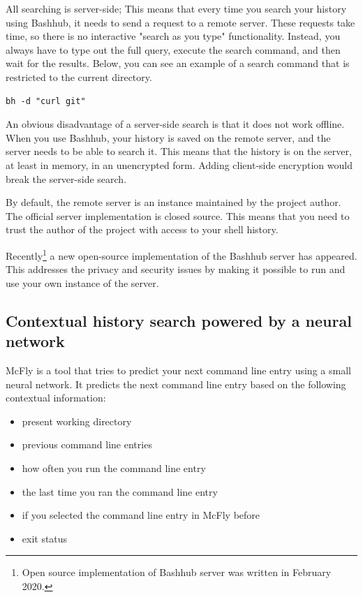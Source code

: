 All searching is server-side; This means that every time you search your history using Bashhub, it needs to send a request to a remote server.
These requests take time, so there is no interactive "search as you type" functionality. Instead, you always have to type out the full query, execute the search command, and then wait for the results. Below, you can see an example of a search command that is restricted to the current directory. 

\begin{verbatim}
bh -d "curl git"
\end{verbatim}

An obvious disadvantage of a server-side search is that it does not work offline. 
When you use Bashhub, your history is saved on the remote server, and the server needs to be able to search it. This means that the history is on the server, at least in memory, in an unencrypted form. Adding client-side encryption would break the server-side search.

By default, the remote server is an instance maintained by the project author. The official server implementation is closed source. This means that you need to trust the author of the project with access to your shell history. 

Recently\footnote{Open source implementation of Bashhub server was written in February 2020.} a new open-source implementation\cite{toolsbashhubserver} of the Bashhub server has appeared. This addresses the privacy and security issues by making it possible to run and use your own instance of the server.


\subsection{Contextual history search powered by a neural network}

McFly\cite{toolsmcfly} is a tool that tries to predict your next command line entry using a small neural network. It predicts the next command line entry based on the following contextual information:
\begin{itemize}
    \item present working directory
    \item previous command line entries
    \item how often you run the command line entry
    \item the last time you ran the command line entry
    \item if you selected the command line entry in McFly before
    \item exit status
\end{itemize}

